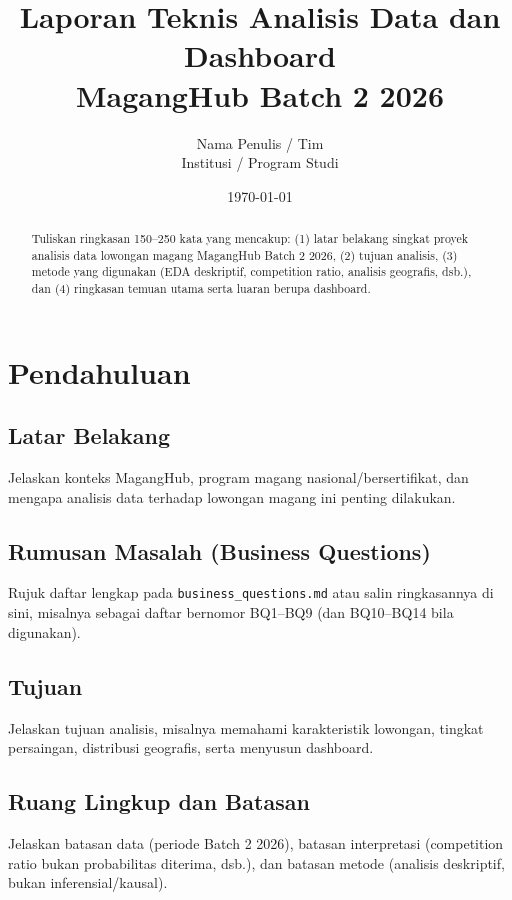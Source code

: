 \documentclass[11pt,a4paper]{report}
\title{
    \Large \textbf{Laporan Teknis Analisis Data dan Dashboard} \\
    \large MagangHub Batch 2 2026
}
\author{Nama Penulis / Tim \\ Institusi / Program Studi}
\date{\today}
\begin{document}
\maketitle

\begin{abstract}
Tuliskan ringkasan 150--250 kata yang mencakup: (1) latar belakang singkat proyek analisis data lowongan magang MagangHub Batch 2 2026, (2) tujuan analisis, (3) metode yang digunakan (EDA deskriptif, competition ratio, analisis geografis, dsb.), dan (4) ringkasan temuan utama serta luaran berupa dashboard.
\end{abstract}

\tableofcontents
\listoffigures
\listoftables

\chapter{Pendahuluan}

\section{Latar Belakang}
Jelaskan konteks MagangHub, program magang nasional/bersertifikat, dan mengapa analisis data terhadap lowongan magang ini penting dilakukan.

\section{Rumusan Masalah (Business Questions)}
Rujuk daftar lengkap pada \texttt{business\_questions.md} atau salin ringkasannya di sini, misalnya sebagai daftar bernomor BQ1--BQ9 (dan BQ10--BQ14 bila digunakan).

\section{Tujuan}
Jelaskan tujuan analisis, misalnya memahami karakteristik lowongan, tingkat persaingan, distribusi geografis, serta menyusun dashboard.

\section{Ruang Lingkup dan Batasan}
Jelaskan batasan data (periode Batch 2 2026), batasan interpretasi (competition ratio bukan probabilitas diterima, dsb.), dan batasan metode (analisis deskriptif, bukan inferensial/kausal).

\end{document}
